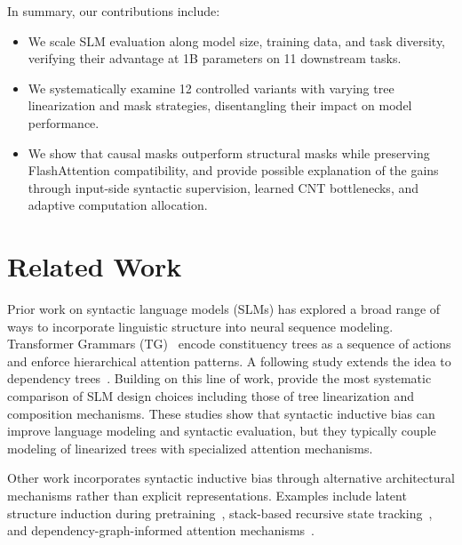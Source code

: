 \documentclass[11pt]{article}
\begin{document}
In summary, our contributions include:
\begin{itemize}[noitemsep]
    \item We scale SLM evaluation along model size, training data, and task diversity, verifying their advantage at 1B parameters on 11 downstream tasks. %
    \item We systematically examine 12 controlled variants with varying tree linearization and mask strategies, disentangling their impact on model performance.
    \item We show that causal masks outperform structural masks while preserving FlashAttention compatibility, and provide possible explanation‌ of the gains through input-side syntactic supervision, learned CNT bottlenecks, and adaptive computation allocation.
\end{itemize}

\section{Related Work}


Prior work on syntactic language models (SLMs) has explored a broad range of ways to incorporate linguistic structure into neural sequence modeling. Transformer Grammars (TG)~\cite{sartran-etal-2022-transformer} encode constituency trees as a sequence of actions and enforce hierarchical attention patterns. A following study extends the idea to dependency trees~\cite{zhao-etal-2024-dependency}. Building on this line of work, \citet{zhao-etal-2025-systematic} provide the most systematic comparison of SLM design choices including those of tree linearization and composition mechanisms. These studies show that syntactic inductive bias can improve language modeling and syntactic evaluation, but they typically couple modeling of linearized trees with specialized attention mechanisms.

Other work incorporates syntactic inductive bias through alternative architectural mechanisms rather than explicit representations. Examples include latent structure induction during pretraining~\cite{hu-etal-2024-generative}, stack-based recursive state tracking~\cite{murty-etal-2023-pushdown}, and dependency-graph-informed attention mechanisms~\cite{huang2026GiLT}.
\end{document}
